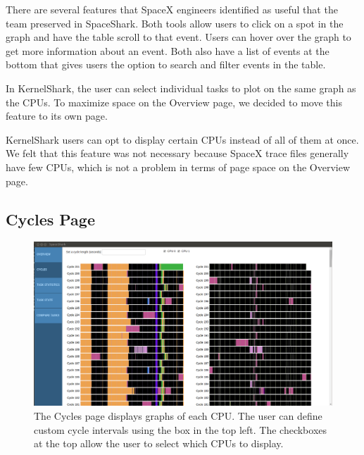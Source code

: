 \documentclass{hmcclinic}
\begin{document}
  There are several features that SpaceX engineers identified as useful that the
  team preserved in SpaceShark. Both tools allow users to click on a spot in the
  graph and have the table scroll to that event.  Users can hover over the graph
  to get more information about an event.  Both also have a list of events
  at the bottom that gives users the option to search and filter events in the
  table.

  In KernelShark, the user can select individual tasks to plot on the same graph
  as the CPUs. To maximize space on the Overview page, we decided to move this
  feature to its own page.

  KernelShark users can opt to display certain CPUs instead of all of them at
  once. We felt that this feature was not necessary because SpaceX trace files
  generally have few CPUs, which is not a problem in terms of page space on the
  Overview page.


    
  \subsection{Cycles Page} %

  \begin{figure}[H]
  \centering
      \includegraphics[width=5in]{cycles-page.png}
  \caption{The Cycles page displays graphs of each CPU. The user can define
  custom cycle intervals using the box in the top left. The checkboxes at the
top allow the user to select which CPUs to display.}
  \end{figure}
  
\end{document}
